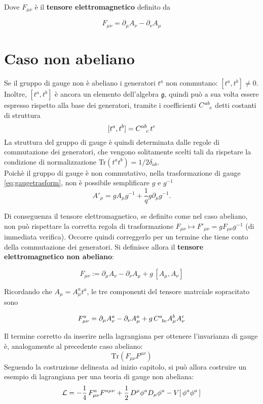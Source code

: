 Dove $F_{\mu\nu}$ è il \textbf{tensore elettromagnetico} definito da

$$
   F_{\mu\nu} = \partial _\mu A _\nu - \partial _\nu A _\mu
$$

\section{Caso non abeliano}
Se il gruppo di gauge non è abeliano i generatori $t^a$ non commutano: $[t^a,t^b] \neq 0$.
Inoltre, $[t^a,t^b]$ è ancora un elemento dell'algebra $\mathfrak{g}$, quindi può a sua
volta essere espresso rispetto alla base dei generatori, tramite i coefficienti
$C^{ab}_{\hphantom{ab}c}$ detti costanti di struttura
$$
   [t^a,t^b] = C^{ab}_{\hphantom{ab}c} \, t^c
$$
La struttura del gruppo di gauge è quindi determinata dalle regole di commutazione
dei generatori, che vengono solitamente scelti tali da rispetare la condizione di
normalizzazione Tr$(t^a t^b) = 1/2 \delta_{ab}$.\\

Poichè il gruppo di gauge è non commutativo, nella trasformazione di gauge
\ref{eq:gaugetrasform}, non è possibile semplificare $g$ e $g^{-1}$
$$
   A'_\mu = g A_\mu g^{-1} + \frac{1}{q} g \partial _\mu g^ {-1}.
$$

Di conseguenza il tensore elettromagnetico, se definito come nel caso abeliano,
non può rispettare la corretta regola di trasformazione $F_{\mu\nu}
\mapsto F'_{\mu\nu} = g F_{\mu\nu} g^{-1}$ (di immediata verifica). Occorre quindi
correggerlo per un termine che tiene conto della commutazione dei generatori. Si
definisce allora il \textbf{tensore elettromagnetico non abeliano}:

\begin{equation}
   F _{\mu\nu} := \partial _\mu A_\nu - \partial _\nu A_\mu + g \, [A_\mu,A_\nu]
\end{equation}

Ricordando che $ A_\mu = A^a_\mu t^a $, le tre componenti del tensore matrciale sopracitato
sono

\begin{equation}
   F_{\mu\nu}^a = \partial _\mu A^a_\nu
       - \partial _\nu A^a_\mu + g \,C^{a}_{\hphantom{a}bc} A^b_\mu A^c_\nu
\end{equation}

Il termine corretto da inserire nella lagrangiana per ottenere l'invarianza di gauge
è, analogamente al precedente caso abeliano:
$$
   \mathrm{Tr}(F_{\mu\nu}F^{\mu\nu})
$$
Seguendo la costruzione delineata ad inizio capitolo, si può allora costruire
un esempio di lagrangiana per una teoria di gauge non abeliana:
\begin{equation}\label{eq:nonabelianlagrangian}
  \mathcal{L} = -\frac{1}{4} \, F^a_{\mu\nu}F^{a\mu\nu}
        + \frac{1}{2} \, D^\mu \phi^a D_\mu \phi^a
        - V[\, \phi^a \phi^a \,]
\end{equation}\\

